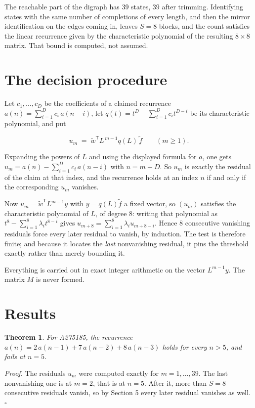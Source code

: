 \documentclass[11pt]{article}
\newtheorem{theorem}{Theorem}
\theoremstyle{definition}
\begin{document}
The reachable part of the digraph has $39$ states, $39$ after trimming. Identifying states with the same number of completions of every length, and then the mirror identification on the edges coming in, leaves $S = 8$ blocks, and the count satisfies the linear recurrence given by the characteristic polynomial of the resulting $8\times8$ matrix. That bound is computed, not assumed.

\section{The decision procedure}

Let $c_1,\dots,c_D$ be the coefficients of a claimed recurrence $a(n) = \sum_{i=1}^{D} c_i\,a(n-i)$, let $q(t) = t^{D} - \sum_{i=1}^{D} c_i t^{D-i}$ be its characteristic polynomial, and put

\[u_m \;=\; \tilde w^{\mathsf T} L^{\,m-1} q(L)\,\tilde f \qquad (m \ge 1).\]

Expanding the powers of $L$ and using the displayed formula for $a$, one gets $u_m = a(n) - \sum_{i=1}^{D} c_i\,a(n-i)$ with $n = m + D$. So $u_m$ is exactly the residual of the claim at that index, and the recurrence holds at an index $n$ if and only if the corresponding $u_m$ vanishes.

Now $u_m = \tilde w^{\mathsf T} L^{m-1} y$ with $y = q(L)\tilde f$ a fixed vector, so $(u_m)$ satisfies the characteristic polynomial of $L$, of degree $8$: writing that polynomial as $t^{8} - \sum_{i=1}^{8} \lambda_i t^{8-i}$ gives $u_{m+8} = \sum_{i=1}^{8} \lambda_i u_{m+8-i}$. Hence $8$ consecutive vanishing residuals force every later residual to vanish, by induction. The test is therefore finite; and because it locates the {\itshape last} nonvanishing residual, it pins the threshold exactly rather than merely bounding it.

Everything is carried out in exact integer arithmetic on the vector $L^{m-1}y$. The matrix $M$ is never formed.

\section{Results}

\begin{theorem} For A275185, the recurrence $a(n) = 2\,a(n-1) + 7\,a(n-2) + 8\,a(n-3)$ holds for every $n > 5$, and fails at $n = 5$.\end{theorem}

{\itshape Proof.} The residuals $u_m$ were computed exactly for $m = 1,\dots,39$. The last nonvanishing one is at $m = 2$, that is at $n = 5$. After it, more than $S = 8$ consecutive residuals vanish, so by Section 5 every later residual vanishes as well. $\square$
\end{document}
